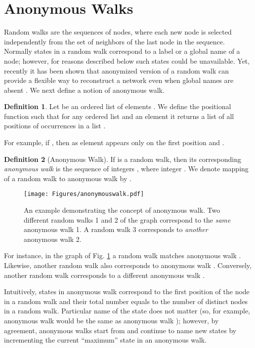 \documentclass{article}
\theoremstyle{definition}
\newtheorem{definition}{Definition}
\begin{document}
\section{Anonymous Walks}

Random walks are the sequences of nodes, where each new node is selected independently from the set of neighbors of the last node in the sequence. Normally states in a random walk correspond to a label or a global name of a node; however, for reasons described below such states could be unavailable. Yet, recently it has been shown that anonymized version of a random walk can provide a flexible way to reconstruct a network even when global names are absent \cite{anonymouswalks}. We next define a notion of anonymous walk. 

\begin{definition}
	Let  be an ordered list of elements . We define the positional function  such that for any ordered list  and an element  it returns a list  of all positions  of  occurrences in a list .
\end{definition}

For example, if , then  as element  appears only on the first position and . 

\begin{definition}[Anonymous Walk]
	If  is a random walk, then its corresponding \textit{anonymous walk} is the sequence of integers , where integer . \newline 
We denote mapping of a random walk  to anonymous walk  by .
\end{definition}

\begin{figure}[h!]
\centering
    \texttt{[image: Figures/anonymouswalk.pdf]}
\caption{An example demonstrating the concept of anonymous walk. Two different random walks 1 and 2 of the graph correspond to the \textit{same} anonymous walk 1. A random walk 3 corresponds to \textit{another} anonymous walk 2.}\label{anonymouswalk}
\end{figure}

For instance, in the graph of Fig. \ref{anonymouswalk} a random walk  matches anonymous walk . Likewise, another random walk  also corresponds to anonymous walk . Conversely, another random walk  corresponds to a different anonymous walk .

Intuitively, states in anonymous walk correspond to the first position of the node in a random walk and their total number equals to the number of distinct nodes in a random walk. Particular name of the state does not matter (so, for example, anonymous walk  would be the same as anonymous walk ); however, by agreement, anonymous walks start from  and continue to name new states by incrementing the current “maximum” state in an anonymous walk. 
\end{document}
